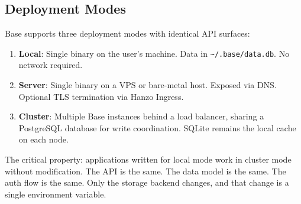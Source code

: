 \subsection{Deployment Modes}

Base supports three deployment modes with identical API surfaces:

\begin{enumerate}[leftmargin=1.4em]
    \item \textbf{Local}: Single binary on the user's machine. Data in
    \texttt{\textasciitilde/.base/data.db}. No network required.
    \item \textbf{Server}: Single binary on a VPS or bare-metal host. Exposed
    via DNS. Optional TLS termination via Hanzo Ingress.
    \item \textbf{Cluster}: Multiple Base instances behind a load balancer,
    sharing a PostgreSQL database for write coordination. SQLite remains the
    local cache on each node.
\end{enumerate}

The critical property: applications written for local mode work in cluster mode
without modification. The API is the same. The data model is the same. The
auth flow is the same. Only the storage backend changes, and that change is a
single environment variable.

